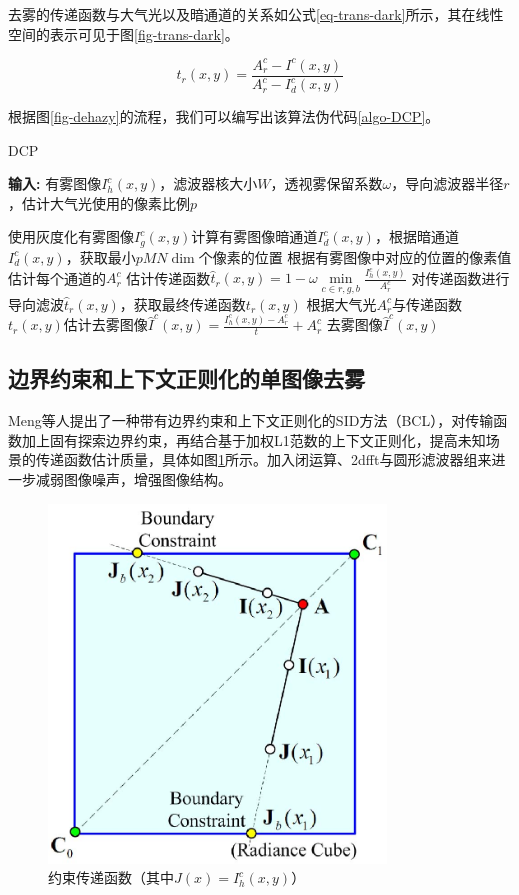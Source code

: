 去雾的传递函数与大气光以及暗通道的关系如公式\eqref{eq-trans-dark}所示，其在线性空间的表示可见于图\ref{fig-trans-dark}。

\begin{equation}
    t_r(x,y) = \frac{A_r^c - I^c(x,y)}{A_r^c - I_d^c(x,y)}
    \label{eq-trans-dark}
\end{equation}

根据图\ref{fig-dehazy}的流程，我们可以编写出该算法伪代码\ref{algo-DCP}。

\begin{algorithm}[t]
    \caption{DCP}
    \label{algo-DCP}
    \textbf{输入:} 有雾图像$I_h^c(x,y)$，滤波器核大小$W$，透视雾保留系数$\omega$，导向滤波器半径$r$，估计大气光使用的像素比例$p$
    \begin{algorithmic}
    \State 使用灰度化有雾图像$I_g^c(x,y)$计算有雾图像暗通道$I_d^c(x,y)$，根据暗通道 $I_d^c(x,y)$，获取最小$pMN\dim$个像素的位置
    \State 根据有雾图像中对应的位置的像素值估计每个通道的$A_r^c$
    \State 估计传递函数$\hat t_r(x,y) = 1 - \omega \min\limits_{c\in{r,g,b}}\frac    {I_h^c(x,y)}{A_r^c}$
    \State 对传递函数进行导向滤波$\hat t_r(x,y)$，获取最终传递函数$t_r(x,y)$
    \State 根据大气光$A_r^c$与传递函数$t_r(x,y)$估计去雾图像$\hat I^c(x,y) = \frac{I_h^c(x,y) - A_r^c}{t} + A_r^c$
    \State \Return 去雾图像$\hat I^c(x,y)$
    \end{algorithmic}
\end{algorithm}

\subsection{边界约束和上下文正则化的单图像去雾}
Meng等人\cite{meng.pan201312}提出了一种带有边界约束和上下文正则化的SID方法（BCL），对传输函数加上固有探索边界约束，再结合基于加权L1范数的上下文正则化，提高未知场景的传递函数估计质量，具体如图\ref{fig-trans-c}所示。加入闭运算、2dfft与圆形滤波器组来进一步减弱图像噪声，增强图像结构。

\begin{figure}[htbp]
    \centering
    \includegraphics[width=0.8\textwidth]{./imgs/g712.png}
    \caption{约束传递函数（其中$J(x) = I_h^c(x,y)$）}
    \label{fig-trans-c}
 \end{figure}

